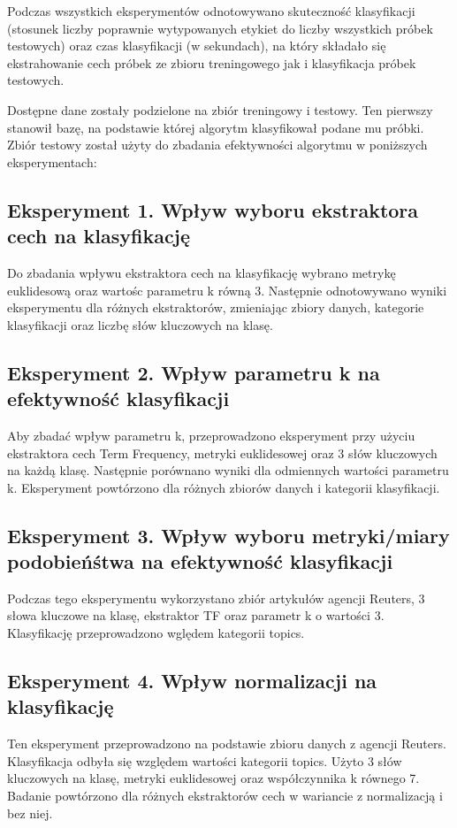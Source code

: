 \documentclass{classrep}
\begin{document}
Podczas wszystkich eksperymentów odnotowywano skuteczność klasyfikacji (stosunek liczby poprawnie wytypowanych etykiet do liczby wszystkich próbek testowych) oraz czas klasyfikacji (w sekundach), na który składało się ekstrahowanie cech próbek ze zbioru treningowego jak i klasyfikacja próbek testowych.

Dostępne dane zostały podzielone na zbiór treningowy i testowy. Ten pierwszy stanowił bazę, na podstawie której algorytm klasyfikował podane mu próbki. Zbiór testowy został użyty do zbadania efektywności algorytmu w poniższych eksperymentach:
\subsection{Eksperyment 1. Wpływ wyboru ekstraktora cech na klasyfikację}
Do zbadania wpływu ekstraktora cech na klasyfikację wybrano metrykę euklidesową oraz wartośc parametru k równą 3. Następnie odnotowywano wyniki eksperymentu dla różnych ekstraktorów, zmieniając zbiory danych, kategorie klasyfikacji oraz liczbę słów kluczowych na klasę. 
\subsection{Eksperyment 2. Wpływ parametru k na efektywność klasyfikacji}
Aby zbadać wpływ parametru k, przeprowadzono eksperyment przy użyciu ekstraktora cech Term Frequency, metryki euklidesowej oraz 3 słów kluczowych na każdą klasę. Następnie porównano wyniki dla odmiennych wartości parametru k. Eksperyment powtórzono dla różnych zbiorów danych i kategorii klasyfikacji. 
\subsection{Eksperyment 3. Wpływ wyboru metryki/miary podobieńśtwa na efektywność klasyfikacji}
Podczas tego eksperymentu wykorzystano zbiór artykułów agencji Reuters, 3 słowa kluczowe na klasę, ekstraktor TF oraz parametr k o wartości 3. Klasyfikację przeprowadzono wględem kategorii topics.
\subsection{Eksperyment 4. Wpływ normalizacji na klasyfikację}
Ten eksperyment przeprowadzono na podstawie zbioru danych z agencji Reuters. Klasyfikacja odbyła się względem wartości kategorii topics. Użyto 3 słów kluczowych na klasę, metryki euklidesowej oraz współczynnika k równego 7. Badanie powtórzono dla różnych ekstraktorów cech w wariancie z normalizacją i bez niej.
\newpage
\end{document}
